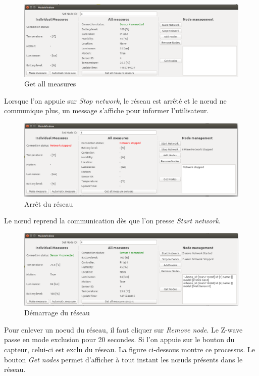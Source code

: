 \begin{figure}[H]
	\begin{center}
		\includegraphics[width=16cm]{img/api3.png}
		\caption{Get all measures}
		\label{api3}
	\end{center}
\end{figure} 
Lorsque l'on appuie sur \textit{Stop network}, le réseau est arrêté et le nœud ne communique plus, un message s'affiche pour informer l'utilisateur.
\begin{figure}[H]
	\begin{center}
		\includegraphics[width=16cm]{img/api4.png}
		\caption{Arrêt du réseau}
		\label{api4}
	\end{center}
\end{figure} 
Le nœud reprend la communication dès que l'on presse \textit{Start network}.
\begin{figure}[H]
	\begin{center}
		\includegraphics[width=16cm]{img/api5.png}
		\caption{Démarrage du réseau}
		\label{api5}
	\end{center}
\end{figure} 
Pour enlever un noeud du réseau, il faut cliquer sur \textit{Remove node}. Le Z-wave passe en mode exclusion pour 20 secondes. Si l'on appuie sur le bouton du capteur, celui-ci est exclu du réseau. La figure ci-dessous montre ce processus. Le bouton \textit{Get nodes} permet d'afficher à tout instant les nœuds présents dans le réseau.
